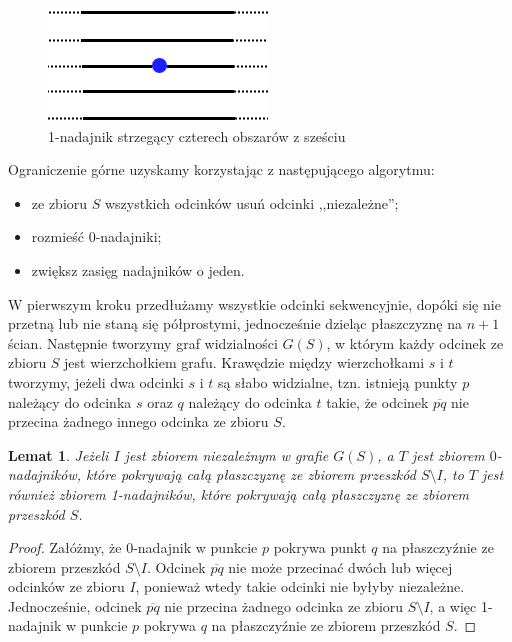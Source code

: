 \documentclass[brudnopis]{xmgr}
\newtheorem{Lemat}{Lemat}
\theoremstyle{definition}
\begin{document}
\begin{figure}[ht!]
  \centering
  \includegraphics{rysunki/k_nadajniki_ogr_dolne.png}
  \caption{1-nadajnik strzegący czterech obszarów z sześciu}
  \label{fig:ogr_dolne}
\end{figure} 

Ograniczenie górne uzyskamy korzystając z następującego algorytmu:
\begin{itemize}
  \item ze zbioru $S$ wszystkich odcinków usuń odcinki ,,niezależne'';
  \item rozmieść 0-nadajniki;
  \item zwiększ zasięg nadajników o jeden.
\end{itemize}

W pierwszym kroku przedłużamy wszystkie odcinki sekwencyjnie, dopóki się nie przetną lub nie staną się półprostymi, jednocześnie dzieląc płaszczyznę na $n + 1$ ścian. Następnie tworzymy graf widzialności $G(S)$, w którym każdy odcinek ze zbioru $S$ jest wierzchołkiem grafu. Krawędzie między wierzchołkami $s$ i $t$ tworzymy, jeżeli dwa odcinki $s$ i $t$ są słabo widzialne, tzn. istnieją punkty $p$ należący do odcinka $s$ oraz $q$ należący do odcinka $t$ takie, że odcinek $\overline{pq}$ nie przecina żadnego innego odcinka ze zbioru $S$.

\begin{Lemat}\label{0-1-nadajniki} \cite{knadajniki}
  Jeżeli $I$ jest zbiorem niezależnym w grafie $G(S)$, a $T$ jest zbiorem $0$-nadajników, które pokrywają całą płaszczyznę ze zbiorem przeszkód $S \setminus I$, to $T$ jest również zbiorem 1-nadajników, które pokrywają całą płaszczyznę ze zbiorem przeszkód $S$.
\end{Lemat}

\begin{proof}
  Załóżmy, że 0-nadajnik w punkcie $p$ pokrywa punkt $q$ na płaszczyźnie ze zbiorem przeszkód $S \setminus I$. Odcinek $\overline{pq}$ nie może przecinać dwóch lub więcej odcinków ze zbioru $I$, ponieważ wtedy takie odcinki nie byłyby niezależne. Jednocześnie, odcinek $\overline{pq}$ nie przecina żadnego odcinka ze zbioru $S \setminus I$, a więc 1-nadajnik w punkcie $p$ pokrywa $q$ na płaszczyźnie ze zbiorem przeszkód $S$.
\end{proof}
\end{document}
